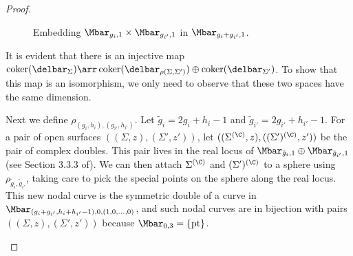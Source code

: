 \begin{lemma}
\begin{proof}
\begin{figure}[ht]
\begin{tikzpicture}
\end{tikzpicture}
\caption{Embedding $\Mbar_{g_i,1} \times \Mbar_{g_{i'},1}$ in $\Mbar_{g_i+g_{i'},1}$.}
\end{figure}
It is evident that there is an injective map $\coker(\delbar_{\Sigma}) \arr \coker(\delbar_{\rho(\Sigma,\Sigma')}) \oplus \coker(\delbar_{\Sigma'})$. To show that this map is an isomorphism, we only need to observe that these two spaces have the same dimension.

Next we define $\rho_{(g_i,h_i),(g_{i'},h_{i'})}$. Let $\tilde{g}_i=2g_i+h_i-1$ and $\tilde{g}_{i'}=2g_{i'}+h_{i'}-1$. For a pair of open surfaces $((\Sigma,z),(\Sigma',z'))$, let $((\Sigma^{(\C)},z),((\Sigma')^{(\C)},z'))$ be the pair of complex doubles. This pair lives in the real locus of $\Mbar_{\tilde{g}_i,1} \oplus \Mbar_{\tilde{g}_{i'},1}$ (see Section 3.3.3 of\cite{katzLiu}). We can then attach $\Sigma^{(\C)}$ and $(\Sigma')^{(\C)}$ to a sphere using $\rho_{\tilde{g}_i,\tilde{g}_{i'}}$, taking care to pick the special points on the sphere along the real locus. This new nodal curve is the symmetric double of a curve in $\Mbar_{(g_i+g_{i'},h_i+h_{i'}-1),0,(1,0,\ldots,0)}$, and such nodal curves are in bijection with pairs $((\Sigma,z),(\Sigma',z'))$ because $\Mbar_{0,3}=\{\text{pt}\}$.
\begin{figure}[ht]
\centering
{}
\end{figure}
\end{proof}
\end{lemma}
